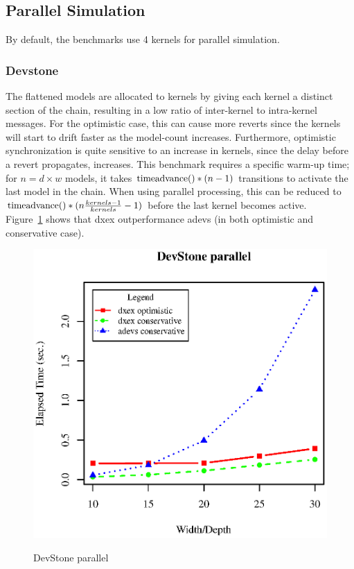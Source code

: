 \subsection{Parallel Simulation}
By default, the benchmarks use 4 kernels for parallel simulation.
\subsubsection{Devstone}
The flattened models are allocated to kernels by giving each kernel a distinct section of the chain, resulting in a low ratio of inter-kernel to intra-kernel messages. For the optimistic case, this can cause more reverts since the kernels will start to drift faster as the model-count increases. Furthermore, optimistic synchronization is quite sensitive to an increase in kernels, since the delay before a revert propagates, increases. This benchmark requires a specific warm-up time; for $n=d\times w$ models, it takes $\textup{timeadvance}()*(n-1)$ transitions to activate the last model in the chain. When using parallel processing, this can be reduced to $\textup{timeadvance}()*(n\frac{kernels-1}{kernels} -1)$ before the last kernel becomes active.\\
Figure~\ref{fig:DevstoneParallel} shows that dxex outperformance adevs (in both optimistic and conservative case).
\begin{figure}[ltbh]
	\includegraphics[width=.5\textwidth]{fig/fig2.eps}
	\label{fig:DevstoneParallel}
	\caption{DevStone parallel}
\end{figure}
